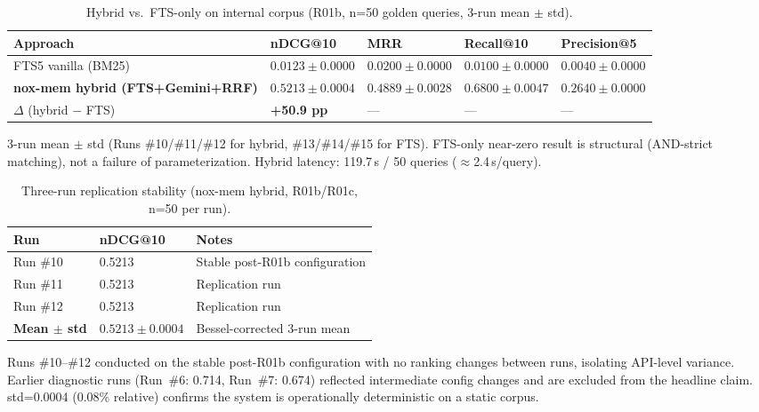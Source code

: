 \documentclass{article}
\begin{document}
\begin{table}[t]
  \caption{Hybrid vs.\ FTS-only on internal corpus
    (R01b, n=50 golden queries, 3-run mean $\pm$ std).}
  \label{tab:hybrid}
  \centering
  \begin{tabular}{lllll}
    \toprule
    Approach & nDCG@10 & MRR & Recall@10 & Precision@5 \\
    \midrule
    FTS5 vanilla (BM25) & $0.0123 \pm 0.0000$ & $0.0200 \pm 0.0000$ & $0.0100 \pm 0.0000$ & $0.0040 \pm 0.0000$ \\
    \textbf{nox-mem hybrid (FTS+Gemini+RRF)} & $\mathbf{0.5213 \pm 0.0004}$ & $0.4889 \pm 0.0028$ & $0.6800 \pm 0.0047$ & $0.2640 \pm 0.0000$ \\
    $\Delta$ (hybrid $-$ FTS) & \textbf{+50.9 pp} & --- & --- & --- \\
    \bottomrule
  \end{tabular}
  \begin{minipage}{\linewidth}
    \vspace{4pt}
    \footnotesize
    3-run mean $\pm$ std (Runs \#10/\#11/\#12 for hybrid, \#13/\#14/\#15 for FTS).
    FTS-only near-zero result is structural (AND-strict matching), not a failure of
    parameterization. Hybrid latency: 119.7\,s / 50 queries ($\approx$2.4\,s/query).
  \end{minipage}
\end{table}

\begin{table}[t]
  \caption{Three-run replication stability
    (nox-mem hybrid, R01b/R01c, n=50 per run).}
  \label{tab:replication}
  \centering
  \begin{tabular}{lll}
    \toprule
    Run & nDCG@10 & Notes \\
    \midrule
    Run \#10 & 0.5213 & Stable post-R01b configuration \\
    Run \#11 & 0.5213 & Replication run \\
    Run \#12 & 0.5213 & Replication run \\
    \textbf{Mean $\pm$ std} & $\mathbf{0.5213 \pm 0.0004}$ & Bessel-corrected 3-run mean \\
    \bottomrule
  \end{tabular}
  \begin{minipage}{\linewidth}
    \vspace{4pt}
    \footnotesize
    Runs \#10--\#12 conducted on the stable post-R01b configuration with no ranking changes
    between runs, isolating API-level variance. Earlier diagnostic runs (Run~\#6: 0.714,
    Run~\#7: 0.674) reflected intermediate config changes and are excluded from the headline
    claim. std=0.0004 (0.08\% relative) confirms the system is operationally deterministic
    on a static corpus.
  \end{minipage}
\end{table}
\end{document}
